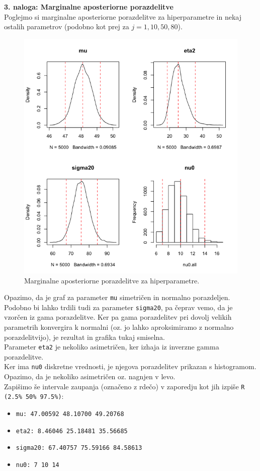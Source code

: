 \documentclass[a4paper,11pt]{article}
\begin{document}
\newpage
\noindent
\textbf{3. naloga: Marginalne aposteriorne porazdelitve}
\\
Poglejmo si marginalne aposteriorne porazdelitve za hiperparametre in nekaj ostalih parametrov (podobno kot prej za $j = 1, 10, 50, 80$).

\begin{figure}[ht!]
    \centering
    \includegraphics[width = 160mm]{Slike/3_hiper.png}
    \caption{Marginalne aposteriorne porazdelitve za hiperparametre.}
\end{figure}
\noindent
Opazimo, da je graf za parameter \texttt{mu} simetričen in normalno porazdeljen. 
\\
Podobno bi lahko trdili tudi za parameter \texttt{sigma20}, pa čeprav vemo, da je vzorčen iz gama porazdelitve. 
Ker pa gama porazdelitev pri dovolj velikih parametrih konvergira k normalni (oz. jo lahko aproksimiramo z normalno porazdelitvijo), je rezultat in grafika tukaj smiselna.
\\
Parameter \texttt{eta2} je nekoliko asimetričen, ker izhaja iz inverzne gamma porazdelitve.
\\
Ker ima \texttt{nu0} diskretne vrednosti, je njegova porazdelitev prikazan s histogramom. Opazimo, da je nekoliko asimetričen oz. nagnjen v levo.
\\
Zapišimo še intervale zaupanja (označeno z rdečo) v zaporedju kot jih izpiše \texttt{R (2.5\%       50\%     97.5\%)}:
\begin{itemize}
    \item \texttt{mu: 47.00592 48.10700 49.20768 }
    \item \texttt{eta2: 8.46046 25.18481 35.56685}    
    \item \texttt{sigma20: 67.40757 75.59166 84.58613 }
    \item \texttt{nu0: 7    10    14  }
\end{itemize}
\end{document}

